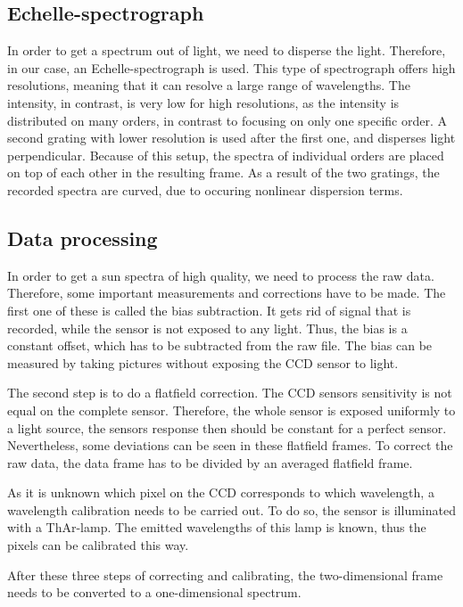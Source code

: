 \subsection{Echelle-spectrograph}
In order to get a spectrum out of light, we need to disperse the light. Therefore, in our case, an Echelle-spectrograph is used. This type of spectrograph offers high resolutions, meaning that it can resolve a large range of wavelengths. The intensity, in contrast, is very low for high resolutions, as the intensity is distributed on many orders, in contrast to focusing on only one specific order. 
A second grating with lower resolution is used after the first one, and disperses light perpendicular. Because of this setup, the spectra of individual orders are placed on top of each other in the resulting frame. As a result of the two gratings, the recorded spectra are curved, due to occuring nonlinear dispersion terms. 





\subsection{Data processing}
In order to get a sun spectra of high quality, we need to process the raw data. Therefore, some important measurements and corrections have to be made. 
The first one of these is called the bias subtraction. It gets rid of signal that is recorded, while the sensor is not exposed to any light. Thus, the bias is a constant offset, which has to be subtracted from the raw file. The bias can be measured by taking pictures without exposing the CCD sensor to light. \newline

The second step is to do a flatfield correction. The CCD sensors sensitivity is not equal on the complete sensor. Therefore, the whole sensor is exposed uniformly to a light source, the sensors response then should be constant for a perfect sensor. Nevertheless, some deviations can be seen in these flatfield frames. To correct the raw data, the data frame has to be divided by an averaged flatfield frame.  \newline

As it is unknown which pixel on the CCD corresponds to which wavelength, a wavelength calibration needs to be carried out. To do so, the sensor is illuminated with a ThAr-lamp. The emitted wavelengths of this lamp is known, thus the pixels can be calibrated this way. 

After these three steps of correcting and calibrating, the two-dimensional frame needs to be converted to a one-dimensional spectrum. 

